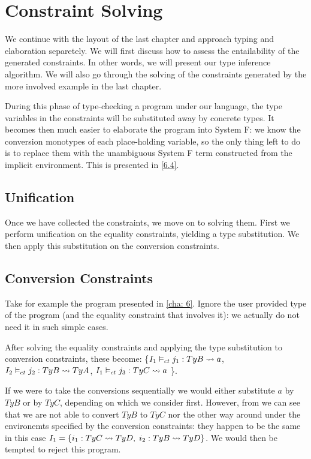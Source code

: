 \chapter{Constraint Solving}
\label{cha:6}
We continue with the layout of the last chapter and approach typing and elaboration separetely. We will first discuss how to assess the entailability of the generated constraints. In other words, we will present our type inference algorithm. We will also go through the solving of the constraints generated by the more involved example in the last chapter.

During this phase of type-checking a program under our language, the type variables in the constraints will be substituted away by concrete types. It becomes then much easier to elaborate the program into System F: we know the conversion monotypes of each place-holding variable, so the only thing left to do is to replace them with the unambiguous System F term constructed from the implicit environment. This is presented in \ref{6.4}.

\section{Unification}
\label{sec uni}

Once we have collected the constraints, we move on to solving them. First we perform unification on the equality constraints, yielding a type substitution. We then apply this substitution on the conversion constraints.

\section{Conversion Constraints}

Take for example the program presented in \ref{cha: 6}. Ignore the user provided type of the program (and the equality constraint that involves it): we actually do not need it in such simple cases.

After solving the equality constraints and applying the type substitution to conversion constraints, these become: \{${I_1} \vDash_{ct} {j_1}: {TyB} \rightsquigarrow {a}$, ${I_2} \vDash_{ct} {j_2}: {TyB} \rightsquigarrow {TyA}$, ${I_1} \vDash_{ct} {j_3}: {TyC} \rightsquigarrow {a}$ \}.

If we were to take the conversions sequentially we would either substitute $a$ by $TyB$ or by $TyC$, depending on which we consider first. However, from we can see that we are not able to convert $TyB$ to $TyC$ nor the other way around under the environemts specified by the conversion constraints: they happen to be the same in this case $I_1 = \{i_1 : TyC \rightsquigarrow TyD, \;i_2 : TyB \rightsquigarrow TyD \}$. We would then be tempted to reject this program.

